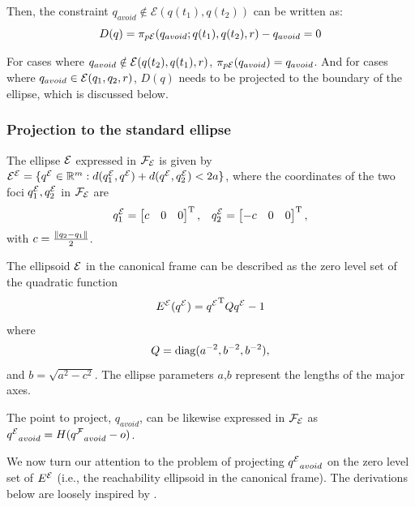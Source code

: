 \documentclass[journal]{IEEEtran}  %
\begin{document}
  Then, the constraint $q_{avoid}\notin\mathcal{E}(q(t_1),q(t_2))$ can be written as:
  \begin{equation}
    D(q) = \pi_{p\mathcal{E}}(q_{avoid};q(t_1),q(t_2),r)-q_{avoid} = 0
  \end{equation}

  For cases where $q_{avoid} \notin \mathcal{E}(q(t_2),q(t_1),r)$, $\pi_{p\mathcal{E}}(q_{avoid}) = q_{avoid}$. And for cases where $q_{avoid} \in \mathcal{E}(q_1,q_2,r)$, $D(q)$ needs to be projected to the boundary of the ellipse, which is discussed below.


  \subsubsection{Projection to the standard ellipse}
  The ellipse $\mathcal{E}$ expressed in $\mathcal{F}_{\mathcal{E}}$ is given by ${\mathcal{E}^{\mathcal{E}}}=\{{q^{\mathcal{E}}}\in\mathbb{R}^{m}{}:d(q^{\mathcal{E}}_1,{q^{\mathcal{E}}})+d({q^{\mathcal{E}}},q^{\mathcal{E}}_2)<2a\}$, where the coordinates of the two foci $q^{\mathcal{E}}_1,q^{\mathcal{E}}_2$ in $\mathcal{F}_{\mathcal{E}}$ are
  \begin{align}
    q^{\mathcal{E}}_1=\begin{bmatrix}c & 0 & 0\end{bmatrix}^\mathrm{T}, && q^{\mathcal{E}}_2=\begin{bmatrix}-c & 0 & 0\end{bmatrix}^\mathrm{T},
  \end{align}
  with $c=\frac{\lVert q_2-q_1\rVert}{2}$.

  The ellipsoid $\mathcal{E}$ in the canonical frame can be described as the zero level set of the quadratic function
  \begin{equation}\label{equ:standard-ellipse}
    {E^{\mathcal{E}}}({q^{\mathcal{E}}}) = {q^{\mathcal{E}}}^\mathrm{T} Q {q^{\mathcal{E}}} - 1
  \end{equation}
  where
  \begin{equation}
    Q = \operatorname{diag}(a^{-2},b^{-2},b^{-2}),
  \end{equation}
  and $b = \sqrt{a^2-c^2}$.
  The ellipse parameters $a$,$b$ represent the lengths of the major axes.


  The point to project, $q_{avoid}$, can be likewise expressed in $\mathcal{F}_{\mathcal{E}}$ as ${q^{\mathcal{E}}}_{avoid} =  H ({q^{\mathcal{F}}}_{avoid}-o)$.

  We now turn our attention to the problem of projecting ${q^{\mathcal{E}}}_{avoid}$ on the zero level set of $E^{\mathcal{E}}$ (i.e., the reachability ellipsoid in the canonical frame). The derivations below are loosely inspired by \cite{eberly}.
\end{document}
